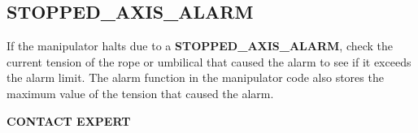 \subsection{STOPPED\_AXIS\_ALARM}
  
  If the manipulator halts due to a {\bf STOPPED\_AXIS\_ALARM},
check the current tension of the rope or umbilical that caused the
alarm to see if it exceeds the alarm limit.  The alarm function in
the manipulator code also stores the maximum value of the tension
that caused the alarm.  

{\bf CONTACT EXPERT}


 
  



